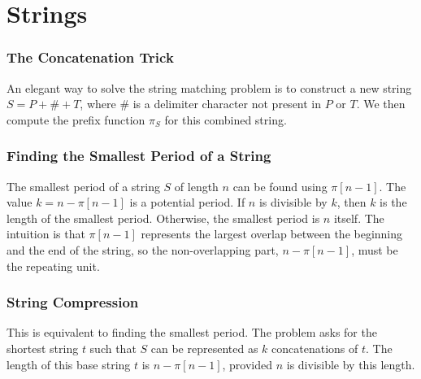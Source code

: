 \section{Strings}

\subsubsection{The Concatenation Trick}
An elegant way to solve the string matching problem is to construct a new string $S = P + \# + T$, where $\#$ is a delimiter character not present in $P$ or $T$. We then compute the prefix function $\pi_S$ for this combined string.

\subsubsection{Finding the Smallest Period of a String}
The smallest period of a string $S$ of length $n$ can be found using $\pi[n-1]$. The value $k = n - \pi[n-1]$ is a potential period. If $n$ is divisible by $k$, then $k$ is the length of the smallest period. Otherwise, the smallest period is $n$ itself. The intuition is that $\pi[n-1]$ represents the largest overlap between the beginning and the end of the string, so the non-overlapping part, $n - \pi[n-1]$, must be the repeating unit.

\subsubsection{String Compression}
This is equivalent to finding the smallest period. The problem asks for the shortest string $t$ such that $S$ can be represented as $k$ concatenations of $t$. The length of this base string $t$ is $n - \pi[n-1]$, provided $n$ is divisible by this length.